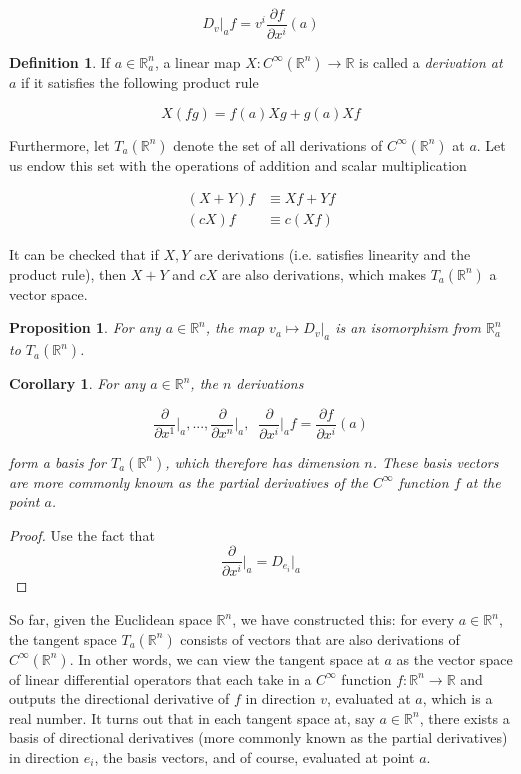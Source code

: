 \documentclass{article}
\newtheorem{proposition}[theorem]{Proposition}
\newtheorem{corollary}{Corollary}[theorem]
\theoremstyle{remark}
\theoremstyle{definition}
\newtheorem{definition}{Definition}[section]
\begin{document}
      \[D_v \big|_a f = v^i \frac{\partial f}{\partial x^i} (a)\]

    \begin{definition}
      If $a \in \mathbb{R}^n_a$, a linear map $X: C^\infty (\mathbb{R}^n) \longrightarrow \mathbb{R}$ is called a \textit{derivation at $a$} if it satisfies the following product rule 

        \[X (f g) = f(a) X g + g(a) X f\]

      Furthermore, let $T_a (\mathbb{R}^n)$ denote the set of all derivations of $C^\infty (\mathbb{R}^n)$ at $a$. Let us endow this set with the operations of addition and scalar multiplication 

      \begin{align*}
        (X + Y) f & \equiv X f + Y f \\
        (c X) f & \equiv c (X f)
      \end{align*}

      It can be checked that if $X, Y$ are derivations (i.e. satisfies linearity and the product rule), then $X + Y$ and $c X$ are also derivations, which makes $T_a (\mathbb{R}^n)$ a vector space. 
    \end{definition}

    \begin{proposition}
      For any $a \in \mathbb{R}^n$, the map $v_a \mapsto D_v |_a$ is an isomorphism from $\mathbb{R}_a^n$ to $T_a (\mathbb{R}^n)$. 
    \end{proposition}

    \begin{corollary}
      For any $a \in \mathbb{R}^n$, the $n$ derivations 

        \[\frac{\partial}{\partial x^1} \bigg|_a, ..., \frac{\partial}{\partial x^n} \bigg|_a, \;\; \frac{\partial}{\partial x^i} \bigg|_a f = \frac{\partial f}{\partial x^i} (a)\]

      form a basis for $T_a (\mathbb{R}^n)$, which therefore has dimension $n$. These basis vectors are more commonly known as the partial derivatives of the $C^\infty$ function $f$ at the point $a$. 
    \end{corollary}
    \begin{proof}
      Use the fact that 
        \[\frac{\partial}{\partial x^i} \bigg|_a = D_{e_i} \big|_a\]
    \end{proof}

    So far, given the Euclidean space $\mathbb{R}^n$, we have constructed this: for every $a \in \mathbb{R}^n$, the tangent space $T_a (\mathbb{R}^n)$ consists of vectors that are also derivations of $C^\infty (\mathbb{R}^n)$. In other words, we can view the tangent space at $a$ as the vector space of linear differential operators that each take in a $C^\infty$ function $f: \mathbb{R}^n \longrightarrow \mathbb{R}$ and outputs the directional derivative of $f$ in direction $v$, evaluated at $a$, which is a real number. It turns out that in each tangent space at, say $a \in \mathbb{R}^n$, there exists a basis of directional derivatives (more commonly known as the partial derivatives) in direction $e_i$, the basis vectors, and of course, evaluated at point $a$. 
\end{document}
